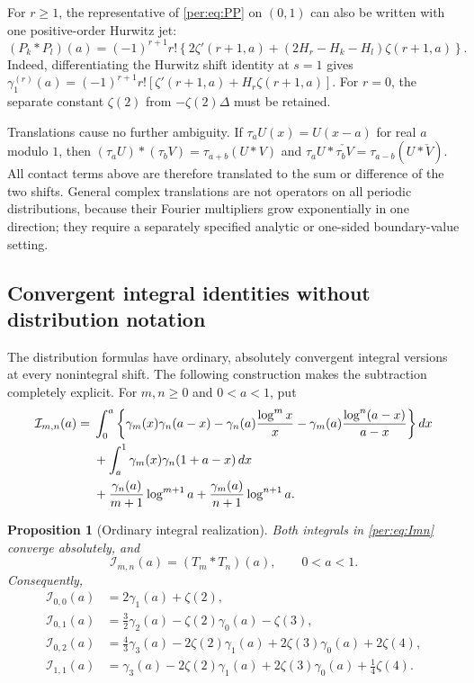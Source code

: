 \documentclass[11pt,letterpaper]{article}
\numberwithin{equation}{section}
\theoremstyle{plain}
\newtheorem{proposition}[theorem]{Proposition}
\theoremstyle{definition}
\theoremstyle{remark}
\begin{document}
For $r\ge1$, the representative of \eqref{per:eq:PP} on $(0,1)$ can
also be written with one positive-order Hurwitz jet:
\begin{equation}\label{per:eq:PPordinary}
 (P_k*P_l)(a)=(-1)^{r+1}r!
 \left\{2\zeta'(r+1,a)+(2H_r-H_k-H_l)\zeta(r+1,a)\right\}.
\end{equation}
Indeed, differentiating the Hurwitz shift identity at $s=1$ gives
$\gamma_1^{(r)}(a)=(-1)^{r+1}r![\zeta'(r+1,a)+H_r\zeta(r+1,a)]$.
For $r=0$, the separate constant $\zeta(2)$ from $-\zeta(2)\Delta$
must be retained.

Translations cause no further ambiguity. If
$\tau_aU(x)=U(x-a)$ for real $a$ modulo $1$, then
$(\tau_aU)*(\tau_bV)=\tau_{a+b}(U*V)$ and
$\tau_aU*\check{\tau_bV}=\tau_{a-b}(U*\check V)$.
All contact terms above are therefore translated to the sum or difference
of the two shifts. General complex translations are not operators on all
periodic distributions, because their Fourier multipliers grow
exponentially in one direction; they require a separately specified
analytic or one-sided boundary-value setting.

\subsection{Convergent integral identities without distribution notation}

The distribution formulas have ordinary, absolutely convergent integral
versions at every nonintegral shift. The following construction makes
the subtraction completely explicit. For $m,n\ge0$ and $0<a<1$, put
\begin{align}
 \mathcal I_{m,n}(a)={}&
 \int_0^a\left\{\gamma_m(x)\gamma_n(a-x)
       -\gamma_n(a)\frac{\log^m x}{x}
       -\gamma_m(a)\frac{\log^n(a-x)}{a-x}\right\}dx\notag\\
 &+\int_a^1\gamma_m(x)\gamma_n(1+a-x)\,dx\notag\\
 &+\frac{\gamma_n(a)}{m+1}\log^{m+1}a
       +\frac{\gamma_m(a)}{n+1}\log^{n+1}a.
 \label{per:eq:Imn}
\end{align}

\begin{proposition}[Ordinary integral realization]
\label{per:prop:Imn}
Both integrals in \eqref{per:eq:Imn} converge absolutely, and
\[
 \mathcal I_{m,n}(a)=(T_m*T_n)(a),\qquad 0<a<1.
\]
Consequently,
\begin{align}
 \mathcal I_{0,0}(a)&=2\gamma_1(a)+\zeta(2),
 \label{per:eq:I00}\\
 \mathcal I_{0,1}(a)&=\frac32\gamma_2(a)-\zeta(2)\gamma_0(a)-\zeta(3),
 \label{per:eq:I01}\\
 \mathcal I_{0,2}(a)&=\frac43\gamma_3(a)-2\zeta(2)\gamma_1(a)
                         +2\zeta(3)\gamma_0(a)+2\zeta(4),
 \label{per:eq:I02}\\
 \mathcal I_{1,1}(a)&=\gamma_3(a)-2\zeta(2)\gamma_1(a)
                         +2\zeta(3)\gamma_0(a)+\frac14\zeta(4).
 \label{per:eq:I11}
\end{align}
\end{proposition}
\end{document}
